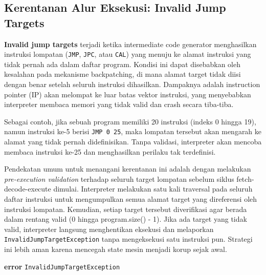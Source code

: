 \subsection{Kerentanan Alur Eksekusi: Invalid Jump Targets}

\textbf{Invalid jump targets} terjadi ketika intermediate code generator menghasilkan instruksi lompatan (\texttt{JMP}, \texttt{JPC}, atau \texttt{CAL}) yang menuju ke alamat instruksi yang tidak pernah ada dalam daftar program. Kondisi ini dapat disebabkan oleh kesalahan pada mekanisme backpatching, di mana alamat target tidak diisi dengan benar setelah seluruh instruksi dihasilkan. Dampaknya adalah instruction pointer (IP) akan melompat ke luar batas vektor instruksi, yang menyebabkan interpreter membaca memori yang tidak valid dan crash secara tiba-tiba.

Sebagai contoh, jika sebuah program memiliki 20 instruksi (indeks 0 hingga 19), namun instruksi ke-5 berisi \texttt{JMP 0 25}, maka lompatan tersebut akan mengarah ke alamat yang tidak pernah didefinisikan. Tanpa validasi, interpreter akan mencoba membaca instruksi ke-25 dan menghasilkan perilaku tak terdefinisi.

Pendekatan umum untuk menangani kerentanan ini adalah dengan melakukan \textit{pre-execution validation} terhadap seluruh target lompatan sebelum siklus fetch-decode-execute dimulai. Interpreter melakukan satu kali traversal pada seluruh daftar instruksi untuk mengumpulkan semua alamat target yang direferensi oleh instruksi lompatan. Kemudian, setiap target tersebut diverifikasi agar berada dalam rentang valid (0 hingga program.size() - 1). Jika ada target yang tidak valid, interpreter langsung menghentikan eksekusi dan melaporkan \texttt{InvalidJumpTargetException} tanpa mengeksekusi satu instruksi pun. Strategi ini lebih aman karena mencegah state mesin menjadi korup sejak awal.

\begin{breakablealgorithm}
    \label{alg:jump-validation}
    \begin{algorithmic}[1]
                    \State \textbf{error} \texttt{InvalidJumpTargetException}
                \EndIf
            \EndIf
        \EndFor
        \EndProcedure
    \end{algorithmic}
\end{breakablealgorithm}

